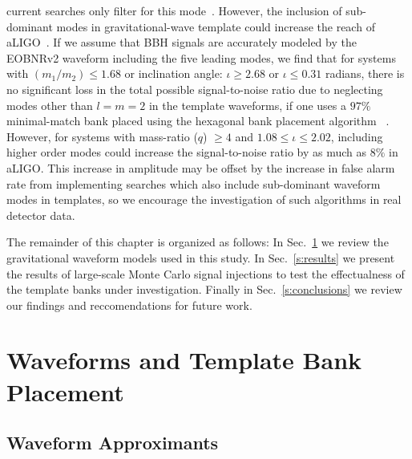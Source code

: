 current searches only filter for this mode~\cite{LSCCBCRates2010}. However,
the inclusion of sub-dominant modes in gravitational-wave template could
increase the reach of aLIGO~\cite{McKechan:2011ps,Pekowsky:2012sr}. If we
assume that BBH signals are accurately modeled by the EOBNRv2 waveform
including the five leading modes, we find that for systems with $(m_1/m_2)\leq
1.68$ or inclination angle: $\iota \geq 2.68$ or $\iota \leq 0.31$ radians, 
there is no significant loss in the total possible signal-to-noise ratio
due to neglecting modes other than $l = m = 2$ in the template waveforms,
if one uses a $97\%$ minimal-match bank placed using the hexagonal bank placement
algorithm ~\cite{SathyaBankPlacementTauN,BabaketalBankPlacement,SathyaMetric2PN,Cokelaer:2007kx}.
However, for systems with mass-ratio ($q$) $\geq 4$ and $1.08\leq\iota\leq 2.02$, including higher order modes could increase
the signal-to-noise ratio by as much as $8\%$ in aLIGO. This increase in
amplitude may be offset by the increase in false alarm rate from implementing
searches which also include sub-dominant waveform modes in templates, so we encourage the 
investigation of such algorithms in real detector data.

The remainder of this chapter is organized as follows: In Sec.~\ref{s:waveforms}
we review the gravitational waveform models used in this study. In
Sec.~\ref{s:results} we present the results of large-scale Monte Carlo signal
injections to test the effectualness of the template banks under
investigation. Finally in Sec.~\ref{s:conclusions} we review our findings and
reccomendations for future work.

\section{Waveforms and Template Bank Placement}
\label{s:waveforms}
\subsection{Waveform Approximants}

